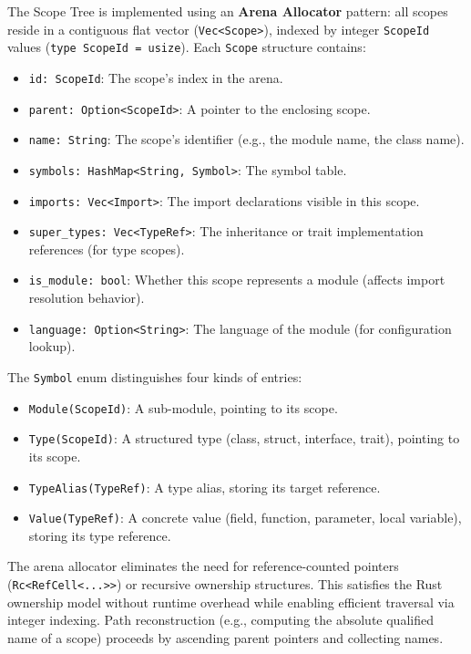 The Scope Tree is implemented using an \textbf{Arena Allocator}
pattern: all scopes reside in a contiguous flat vector
(\texttt{Vec<Scope>}), indexed by integer \texttt{ScopeId} values
(\texttt{type ScopeId = usize}). Each \texttt{Scope} structure contains:

\begin{itemize}
  \item \texttt{id: ScopeId}: The scope's index in the arena.
  \item \texttt{parent: Option<ScopeId>}: A pointer to the enclosing scope.
  \item \texttt{name: String}: The scope's identifier (e.g., the
    module name, the class name).
  \item \texttt{symbols: HashMap<String, Symbol>}: The symbol table.
  \item \texttt{imports: Vec<Import>}: The import declarations
    visible in this scope.
  \item \texttt{super\_types: Vec<TypeRef>}: The inheritance or trait
    implementation references (for type scopes).
  \item \texttt{is\_module: bool}: Whether this scope represents a
    module (affects import resolution behavior).
  \item \texttt{language: Option<String>}: The language of the module
    (for configuration lookup).
\end{itemize}

The \texttt{Symbol} enum distinguishes four kinds of entries:
\begin{itemize}
  \item \texttt{Module(ScopeId)}: A sub-module, pointing to its scope.
  \item \texttt{Type(ScopeId)}: A structured type (class, struct,
    interface, trait), pointing to its scope.
  \item \texttt{TypeAlias(TypeRef)}: A type alias, storing its target reference.
  \item \texttt{Value(TypeRef)}: A concrete value (field, function,
    parameter, local variable), storing its type reference.
\end{itemize}

The arena allocator eliminates the need for reference-counted
pointers (\texttt{Rc<RefCell<...>>}) or recursive ownership
structures. This satisfies the Rust ownership model without runtime
overhead while enabling efficient traversal via integer indexing.
Path reconstruction (e.g., computing the absolute qualified name of a
scope) proceeds by ascending parent pointers and collecting names.

